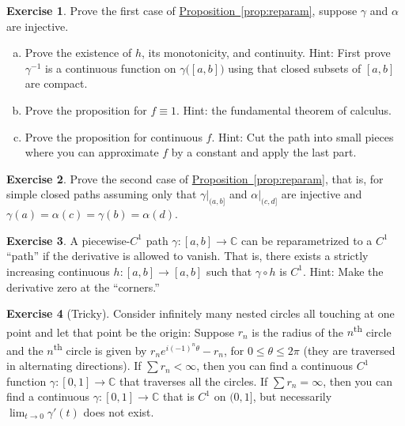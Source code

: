 \documentclass[12pt,openany]{book}
\newcommand{\C}{{\mathbb{C}}}
\newcommand{\myquote}[1]{``#1''}
\theoremstyle{plain}
\theoremstyle{remark}
\theoremstyle{definition}
\newenvironment{exbox}{%
    \def\FrameCommand{\vrule width 1pt \relax\hspace{10pt}}%
    \MakeFramed{\advance\hsize-\width\FrameRestore}%
}{%
    \endMakeFramed
}
\newenvironment{exparts}{%
    \leavevmode\begin{enumerate}[a),noitemsep,topsep=0pt,parsep=0pt,partopsep=0pt]
}{%
    \end{enumerate}
}
\theoremstyle{exercise}
\newtheorem{exercise}{Exercise}[section]
\theoremstyle{example}
\newcommand{\propref}[1]{\hyperref[#1]{Proposition~\ref*{#1}}}
\begin{document}
\begin{exbox}
\begin{exercise}
Prove the first case of \propref{prop:reparam},
suppose $\gamma$ and $\alpha$ are injective.
\begin{exparts}
\item
Prove the existence of $h$, its monotonicity, and continuity.
Hint: First prove $\gamma^{-1}$ is a continuous function on
$\gamma\bigl([a,b]\bigr)$ using that closed subsets of $[a,b]$
are compact.
\item
Prove the proposition for $f\equiv 1$.
Hint: the fundamental theorem of calculus.
\item
Prove the proposition for continuous $f$.
Hint: Cut the path into small pieces where
you can approximate $f$ by a constant and apply the
last part.
\end{exparts}
\end{exercise}

\begin{exercise}
Prove the second case of \propref{prop:reparam}, that is,
for simple closed paths assuming only that $\gamma|_{(a,b]}$ and
$\alpha|_{(c,d]}$ are injective and
$\gamma(a)=\alpha(c)=\gamma(b)=\alpha(d)$.
\end{exercise}

\begin{exercise}
A piecewise-$C^1$ path $\gamma \colon [a,b] \to \C$
can be reparametrized to a $C^1$ \myquote{path} if the derivative
is allowed to vanish.
That is, there exists a strictly increasing
continuous $h \colon [a,b] \to [a,b]$ such that
$\gamma \circ h$ is $C^1$.
Hint: Make the derivative zero at the \myquote{corners.}
\end{exercise}

\begin{exercise}[Tricky]
Consider infinitely many nested circles all touching at one point
and let that point be the origin: Suppose $r_n$ is the radius of the
$n$\textsuperscript{th}
circle and the $n$\textsuperscript{th} circle is given by $r_n e^{i(-1)^n\theta} - r_n$, for $0 \leq
\theta \leq 2\pi$ (they are traversed in alternating directions).
If $\sum r_n < \infty$, then you can find a continuous
$C^1$ function $\gamma \colon
[0,1] \to \C$ that traverses all the circles.  If $\sum r_n = \infty$, then
you can find a continuous $\gamma \colon [0,1] \to \C$ that is $C^1$ on
$(0,1]$, but necessarily $\lim_{t \to 0} \gamma'(t)$ does not exist.
\end{exercise}
\end{exbox}
\end{document}
